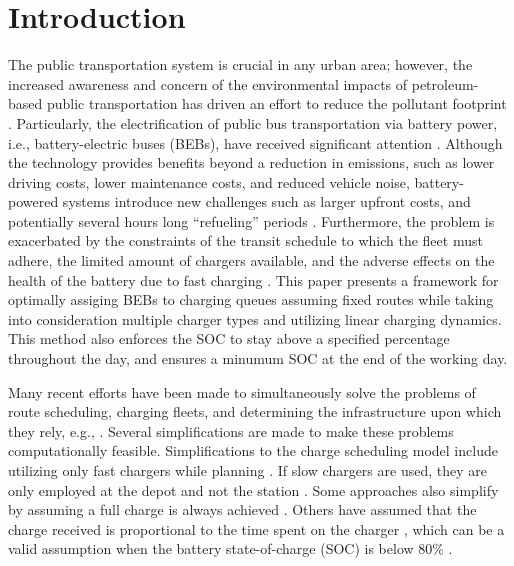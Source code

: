 \documentclass[utf8]{FrontiersinHarvard}
\let\cite\citep                                       %
\begin{document}
\section{Introduction}
\label{sec:introduction}
The public transportation system is crucial in any urban area; however, the increased awareness and concern of the
environmental impacts of petroleum-based public transportation has driven an effort to reduce the pollutant footprint
\cite{de-2014-simul-elect,xylia-2018-role-charg,guida-2017-zeeus-repor-europ,li-2016-batter-elect}. Particularly,
the electrification of public bus transportation via battery power, i.e., battery-electric buses (BEBs), have received
significant attention \cite{li-2016-batter-elect}. Although the technology provides benefits beyond a reduction in
emissions, such as lower driving costs, lower maintenance costs, and reduced vehicle noise, battery-powered systems
introduce new challenges such as larger upfront costs, and potentially several hours long ``refueling'' periods
\cite{xylia-2018-role-charg,li-2016-batter-elect}. Furthermore, the problem is exacerbated by the constraints of the
transit schedule to which the fleet must adhere, the limited amount of chargers available, and the adverse effects on
the health of the battery due to fast charging \cite{lutsey-2019-updat-elect}. This paper presents a
framework for optimally assiging BEBs to charging queues assuming fixed routes while taking into consideration multiple
charger types and utilizing linear charging dynamics. This method also enforces the SOC to stay above a specified
percentage throughout the day, and ensures a minumum SOC at the end of the working day.

Many recent efforts have been made to simultaneously solve the problems of route scheduling, charging fleets, and
determining the infrastructure upon which they rely, e.g., \cite{wei-2018-optim-spatio,sebastiani-2016-evaluat-elect,hoke-2014-accoun-lithium,wang-2017-elect-vehic}. Several simplifications are made to make these problems
computationally feasible. Simplifications to the charge scheduling model include utilizing only fast chargers while
planning \cite{wei-2018-optim-spatio,sebastiani-2016-evaluat-elect,wang-2017-optim-rechar,zhou-2020-bi-objec,yang-2018-charg-sched,wang-2017-elect-vehic,qin-2016-numer-analy,liu-2020-batter-elect}. If slow chargers are used,
they are only employed at the depot and not the station \cite{he-2020-optim-charg,tang-2019-robus-sched}. Some
approaches also simplify by assuming a full charge is always achieved
\cite{wei-2018-optim-spatio,wang-2017-elect-vehic,zhou-2020-bi-objec,wang-2017-optim-rechar}. Others have assumed
that the charge received is proportional to the time spent on the charger
\cite{liu-2020-batter-elect,yang-2018-charg-sched}, which can be a valid assumption when the battery state-of-charge
(SOC) is below 80\% \cite{liu-2020-batter-elect}.
\end{document}
